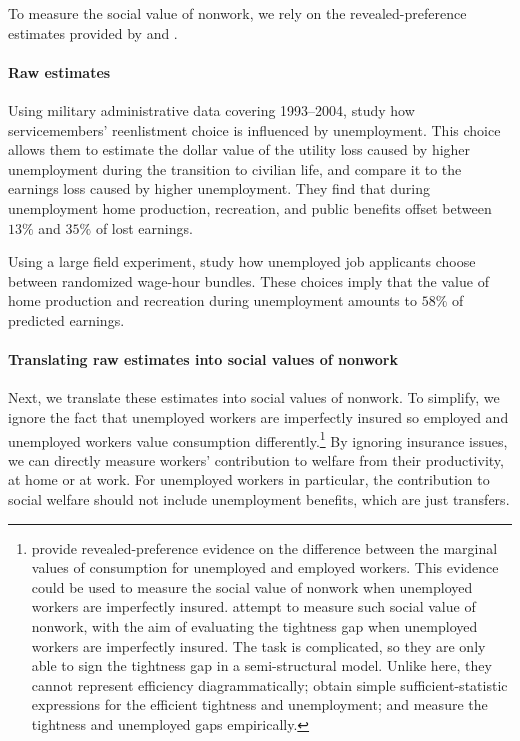 \documentclass[letterpaper,12pt,leqno]{article}
\begin{document}
To measure the social value of nonwork, we rely on the revealed-preference estimates provided by  and . 

\paragraph{Raw estimates} Using military administrative data covering 1993--2004,  study how servicemembers' reenlistment choice is influenced by unemployment. This choice allows them to estimate the dollar value of the utility loss caused by higher unemployment during the transition to civilian life, and compare it to the earnings loss caused by higher unemployment. They find that during unemployment home production, recreation, and public benefits offset between $13\%$ and $35\%$ of lost earnings. 

Using a large field experiment,  study how unemployed job applicants choose between randomized wage-hour bundles. These choices imply that the value of home production and recreation during unemployment amounts to $58\%$ of predicted earnings. 

\paragraph{Translating raw estimates into social values of nonwork} Next, we translate these estimates into social values of nonwork. To simplify, we ignore the fact that unemployed workers are imperfectly insured so employed and unemployed workers value consumption differently.\footnote{ provide revealed-preference evidence on the difference between the marginal values of consumption for unemployed and employed workers. This evidence could be used to measure the social value of nonwork when unemployed workers are imperfectly insured.  attempt to measure such social value of nonwork, with the aim of evaluating the tightness gap when unemployed workers are imperfectly insured. The task is complicated, so they are only able to sign the tightness gap in a semi-structural model. Unlike here, they cannot represent efficiency diagrammatically; obtain simple sufficient-statistic expressions for the efficient tightness and unemployment; and measure the tightness and unemployed gaps empirically.} By ignoring insurance issues, we can directly measure workers' contribution to welfare from their productivity, at home or at work. For unemployed workers in particular, the contribution to social welfare should not include unemployment benefits, which are just transfers.
\end{document}
